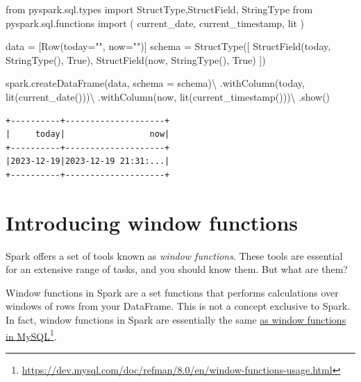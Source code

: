 \documentclass[
  11pt,
  letterpaper,
  DIV=11,
  numbers=noendperiod]{scrreprt}
\newenvironment{Shaded}{\begin{snugshade}}{\end{snugshade}}
\newcommand{\ImportTok}[1]{\textcolor[rgb]{0.00,0.46,0.62}{#1}}
\newcommand{\NormalTok}[1]{\textcolor[rgb]{0.00,0.23,0.31}{#1}}
\newcommand{\OperatorTok}[1]{\textcolor[rgb]{0.37,0.37,0.37}{#1}}
\newcommand{\StringTok}[1]{\textcolor[rgb]{0.13,0.47,0.30}{#1}}
\newcommand{\VariableTok}[1]{\textcolor[rgb]{0.07,0.07,0.07}{#1}}
\begin{document}
\begin{Shaded}
\begin{Highlighting}[]
\ImportTok{from}\NormalTok{ pyspark.sql.types }\ImportTok{import}\NormalTok{ StructType,StructField, StringType}
\ImportTok{from}\NormalTok{ pyspark.sql.functions }\ImportTok{import}\NormalTok{ (}
\NormalTok{    current\_date,}
\NormalTok{    current\_timestamp,}
\NormalTok{    lit}
\NormalTok{)}

\NormalTok{data }\OperatorTok{=}\NormalTok{ [Row(today}\OperatorTok{=}\StringTok{""}\NormalTok{, now}\OperatorTok{=}\StringTok{""}\NormalTok{)]}
\NormalTok{schema }\OperatorTok{=}\NormalTok{ StructType([}
\NormalTok{    StructField(}\StringTok{\textquotesingle{}today\textquotesingle{}}\NormalTok{, StringType(), }\VariableTok{True}\NormalTok{),}
\NormalTok{    StructField(}\StringTok{\textquotesingle{}now\textquotesingle{}}\NormalTok{, StringType(), }\VariableTok{True}\NormalTok{)}
\NormalTok{])}

\NormalTok{spark.createDataFrame(data, schema }\OperatorTok{=}\NormalTok{ schema)}\OperatorTok{\textbackslash{}}
\NormalTok{    .withColumn(}\StringTok{\textquotesingle{}today\textquotesingle{}}\NormalTok{, lit(current\_date()))}\OperatorTok{\textbackslash{}}
\NormalTok{    .withColumn(}\StringTok{\textquotesingle{}now\textquotesingle{}}\NormalTok{, lit(current\_timestamp()))}\OperatorTok{\textbackslash{}}
\NormalTok{    .show()}
\end{Highlighting}
\end{Shaded}

\begin{verbatim}
+----------+--------------------+
|     today|                 now|
+----------+--------------------+
|2023-12-19|2023-12-19 21:31:...|
+----------+--------------------+
\end{verbatim}


\hypertarget{sec-window-functions}{%
\chapter{Introducing window functions}\label{sec-window-functions}}

Spark offers a set of tools known as \emph{window functions}. These
tools are essential for an extensive range of tasks, and you should know
them. But what are them?

Window functions in Spark are a set functions that performs calculations
over windows of rows from your DataFrame. This is not a concept
exclusive to Spark. In fact, window functions in Spark are essentially
the same
\href{https://dev.mysql.com/doc/refman/8.0/en/window-functions-usage.html}{as
window functions in MySQL}\footnote{\url{https://dev.mysql.com/doc/refman/8.0/en/window-functions-usage.html}}.
\end{document}
